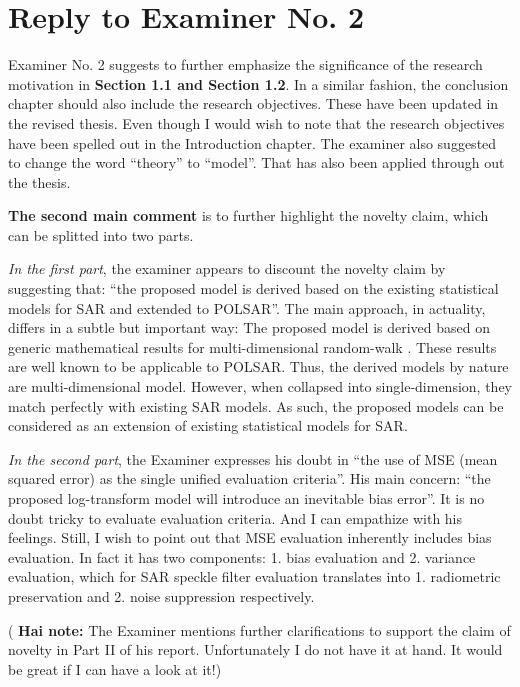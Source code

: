 \section*{Reply to Examiner No. 2}

\begin{replyheader}
\end{replyheader}  

Examiner No. 2 suggests to further emphasize the significance of the research motivation in \textbf{Section 1.1 and Section 1.2}.
In a similar fashion, the conclusion chapter should also include the research objectives.
These have been updated in the revised thesis.
Even though I would wish to note that the research objectives have been spelled out in the Introduction chapter.
The examiner also suggested to change the word ``theory'' to ``model''.
That has also been applied through out the thesis.

\textbf{The second main comment} is to further highlight the novelty claim, which can be splitted into two parts.

\textit{In the first part}, the examiner appears to discount the novelty claim by suggesting that:
 ``the proposed model is derived based on the existing statistical models for SAR and extended to POLSAR''.
The main approach, in actuality, differs in a subtle but important way:
The proposed model is derived based on generic mathematical results for multi-dimensional random-walk \cite{Goodman_JOptSocAm_76, Goodman_Springer_1975}.
These results are well known to be applicable to POLSAR.
Thus, the derived models by nature are multi-dimensional model.
However, when collapsed into single-dimension, they match perfectly with existing SAR models.
As such, the proposed models can be considered as an extension of existing statistical models for SAR.

\textit{In the second part}, the Examiner expresses his doubt in ``the use of MSE (mean squared error) as the single unified evaluation criteria''.
His main concern: ``the proposed log-transform model will introduce an inevitable bias error''.
It is no doubt tricky to evaluate evaluation criteria.
And I can empathize with his feelings.
Still, I wish to point out that MSE evaluation inherently includes bias evaluation. 
In fact it has two components: 1. bias evaluation and 2. variance evaluation, which for SAR speckle filter evaluation translates into 1. radiometric preservation and 2. noise suppression respectively.

( \textbf{ Hai note: }  The Examiner mentions further clarifications to support the claim of novelty in Part II of his report.
Unfortunately I do not have it at hand.
It would be great if I can have a look at it!)

